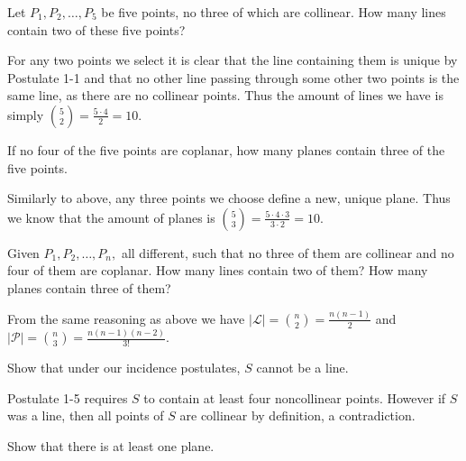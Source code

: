 \begin{problem}
  Let $P_1, P_2, \ldots, P_5$ be five points, no three of which are collinear.
  How many lines contain two of these five points?
\end{problem}

\begin{solution}
  For any two points we select it is clear that the line containing them is unique by Postulate 1-1 and that no other line passing through some other two points is the same line, as there are no collinear points.
  Thus the amount of lines we have is simply $\binom{5}{2} = \frac{5 \cdot 4}{2} = 10$.
\end{solution}

\begin{problem}
  If no four of the five points are coplanar, how many planes contain three of the five points.
\end{problem}

\begin{solution}
  Similarly to above, any three points we choose define a new, unique plane.
  Thus we know that the amount of planes is $\binom{5}{3} = \frac{5 \cdot 4 \cdot 3}{3 \cdot 2} = 10$.
\end{solution}

\begin{problem}
  Given $P_1, P_2, \ldots, P_n,$ all different, such that no three of them are collinear and no four of them are coplanar.
  How many lines contain two of them?
  How many planes contain three of them?
\end{problem}

\begin{solution}
  From the same reasoning as above we have $|\mathscr{L}| = \binom{n}{2} = \frac{n (n - 1)}{2}$ and $|\mathscr{P}| = \binom{n}{3} = \frac{n (n - 1) (n - 2)}{3!}$.
\end{solution}

\begin{problem}
  Show that under our incidence postulates, $S$ cannot be a line.
\end{problem}

\begin{solution}
  Postulate 1-5 requires $S$ to contain at least four noncollinear points.
  However if $S$ was a line, then all points of $S$ are collinear by definition, a contradiction.
\end{solution}

\begin{problem}
  Show that there is at least one plane.
\end{problem}

